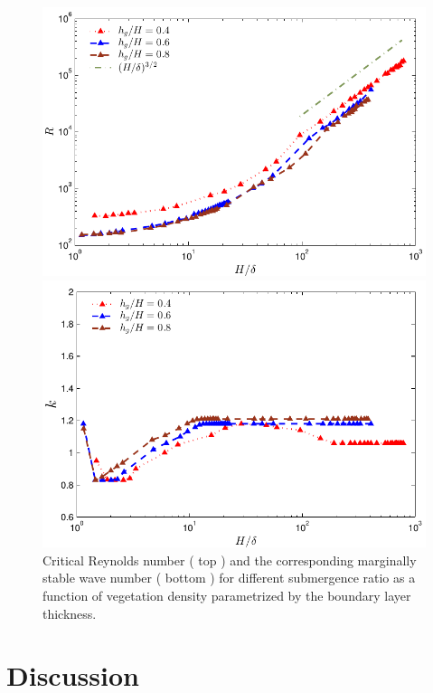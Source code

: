 \documentclass[12pt]{report}   %
\begin{document}
\begin{figure}
 \centerline{\includegraphics{IsotropicDragR_vs_delta}}
 \centerline{\includegraphics{IsotropicDragDeltaVsK}}
 \caption [Critical Reynolds number and the corresponding marginally stable wave number for different submergence ratio as a function of vegetation density  ] {
Critical Reynolds number ( top ) and the corresponding marginally stable wave number ( bottom ) for different submergence ratio as a function of vegetation density parametrized by the boundary layer thickness. }
\label{Symmetric_Re_vs_delta}

\end{figure}




\chapter{Discussion}
\end{document}
